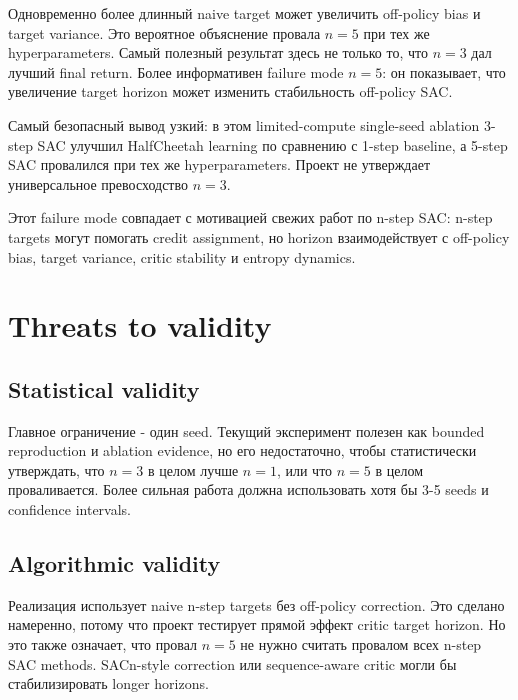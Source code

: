 \documentclass[
  russian,
]{article}
\begin{document}
Одновременно более длинный naive target может увеличить off-policy bias
и target variance. Это вероятное объяснение провала \(n=5\) при тех же
hyperparameters. Самый полезный результат здесь не только то, что
\(n=3\) дал лучший final return. Более информативен failure mode
\(n=5\): он показывает, что увеличение target horizon может изменить
стабильность off-policy SAC.

\begin{warningbox}
Самый безопасный вывод узкий: в этом limited-compute single-seed ablation 3-step SAC улучшил HalfCheetah learning по сравнению с 1-step baseline, а 5-step SAC провалился при тех же hyperparameters. Проект не утверждает универсальное превосходство $n=3$.
\end{warningbox}

Этот failure mode совпадает с мотивацией свежих работ по n-step SAC:
n-step targets могут помогать credit assignment, но horizon
взаимодействует с off-policy bias, target variance, critic stability и
entropy dynamics.

\section{Threats to validity}\label{threats-to-validity}

\subsection{Statistical validity}\label{statistical-validity}

Главное ограничение - один seed. Текущий эксперимент полезен как bounded
reproduction и ablation evidence, но его недостаточно, чтобы
статистически утверждать, что \(n=3\) в целом лучше \(n=1\), или что
\(n=5\) в целом проваливается. Более сильная работа должна использовать
хотя бы 3-5 seeds и confidence intervals.

\subsection{Algorithmic validity}\label{algorithmic-validity}

Реализация использует naive n-step targets без off-policy correction.
Это сделано намеренно, потому что проект тестирует прямой эффект critic
target horizon. Но это также означает, что провал \(n=5\) не нужно
считать провалом всех n-step SAC methods. SACn-style correction или
sequence-aware critic могли бы стабилизировать longer horizons.
\end{document}
